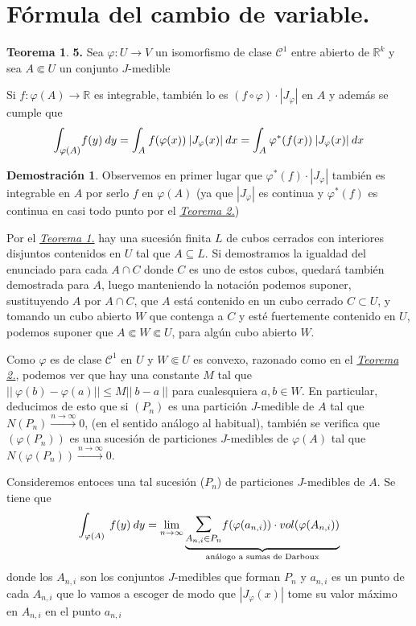 \documentclass[12pt,twoside]{report}
\theoremstyle{azul}
\theoremstyle{azul2}
\theoremstyle{plain}
\theoremstyle{definition}
\newtheorem*{dem}{Demostración}
\newtheorem*{theo}{Teorema}
\theoremstyle{remark}
\begin{document}
\section{Fórmula del cambio de variable.}
\begin{theo}\textbf{5.}
Sea $\varphi: U \longrightarrow V$ un isomorfismo de clase $\mathcal{C}^1$ entre abierto de $\mathbb{R}^k$ y sea $A \Subset U$ un conjunto $J$-medible

Si $f: \varphi(A) \longrightarrow \mathbb{R}$ es integrable, también lo es $(f \circ \varphi) \cdot |J_{\varphi}|$ en $A$ y además se cumple que $$\mathlarger{\int_{\varphi(A)}} f(y) \: dy = \mathlarger{\int_{A}} \: f(\varphi(x)) \: |J_{\varphi}(x)| \: dx = \mathlarger{\int_{A}} \: \varphi^*(f(x)) \: |J_{\varphi}(x)| \: dx $$
\end{theo}
\begin{dem}
Observemos en primer lugar que $\varphi^*(f) \cdot  |J_{\varphi}|$ también es integrable en $A$ por serlo $f$ en $\varphi(A)$ (ya que $|J_{\varphi}|$ es continua y $\varphi^*(f)$ es continua en casi todo punto por el \hyperref[teo2]{\textit{Teorema 2.}})

Por el \hyperref[teo1]{\textit{Teorema 1.}} hay una sucesión finita $L$ de cubos cerrados con interiores disjuntos contenidos en $U$ tal que $A \subseteq L$. Si demostramos la igualdad del enunciado para cada $A \cap C$ donde $C$ es uno de estos cubos, quedará también demostrada para $A$, luego manteniendo la notación podemos suponer, sustituyendo $A$ por $A \cap C$, que $A$ está contenido en un cubo cerrado $C \subset U$, y tomando un cubo abierto $W$ que contenga a $C$ y esté fuertemente contenido en $U$, podemos suponer que $A \Subset W \Subset U$, para algún cubo abierto $W$.

Como $\varphi$ es de clase $\mathcal{C}^1$ en $U$ y $W \Subset U$ es convexo, razonado como en el \hyperref[teo2]{\textit{Teorema 2.}}, podemos ver que hay una constante $M$ tal que $||\: \varphi(b)-\varphi(a)|| \leq M ||\: b-a \: ||$ para cualesquiera $a,b \in W$. En particular, deducimos de esto que si $(P_n)$ es una partición $J$-medible de $A$ tal que $N(P_n) \overset{n \to \infty}{\longrightarrow} 0$, (en el sentido análogo al habitual), también se verifica que $(\varphi(P_n))$ es una sucesión de particiones $J$-medibles de $\varphi(A)$ tal que $N(\varphi(P_n)) \overset{n \to \infty}{\longrightarrow} 0$.

Consideremos entoces una tal sucesión ($P_n$) de particiones $J$-medibles de $A$. Se tiene que 
$$\int_{\varphi(A)} \: f(y) \: dy = \lim_{n \to \infty} \underbrace{ \mathlarger{\mathlarger{\sum}}_{A_{n,i} \in P_n} f(\varphi(a_{n,i})) \cdot vol(\varphi(A_{n,i}))}_{\text{análogo a sumas de Darboux}}$$
donde los $A_{n,i}$ son los conjuntos $J$-medibles que forman $P_n$ y $a_{n,i}$ es un punto de cada $A_{n,i}$ que lo vamos a escoger de modo que $|J_{\varphi}(x)|$ tome su valor máximo en $A_{n,i}$ en el punto $a_{n,i}$ 


\end{dem}
\end{document}
